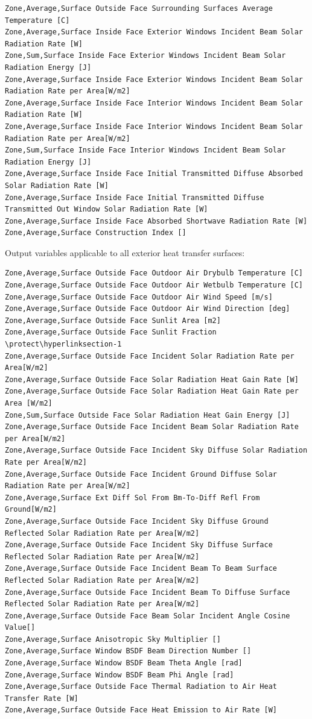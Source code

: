 \begin{lstlisting}
Zone,Average,Surface Outside Face Surrounding Surfaces Average Temperature [C]
Zone,Average,Surface Inside Face Exterior Windows Incident Beam Solar Radiation Rate [W]
Zone,Sum,Surface Inside Face Exterior Windows Incident Beam Solar Radiation Energy [J]
Zone,Average,Surface Inside Face Exterior Windows Incident Beam Solar Radiation Rate per Area[W/m2]
Zone,Average,Surface Inside Face Interior Windows Incident Beam Solar Radiation Rate [W]
Zone,Average,Surface Inside Face Interior Windows Incident Beam Solar Radiation Rate per Area[W/m2]
Zone,Sum,Surface Inside Face Interior Windows Incident Beam Solar Radiation Energy [J]
Zone,Average,Surface Inside Face Initial Transmitted Diffuse Absorbed Solar Radiation Rate [W]
Zone,Average,Surface Inside Face Initial Transmitted Diffuse Transmitted Out Window Solar Radiation Rate [W]
Zone,Average,Surface Inside Face Absorbed Shortwave Radiation Rate [W]
Zone,Average,Surface Construction Index []
\end{lstlisting}

Output variables applicable to all exterior heat transfer surfaces:

\begin{lstlisting}
Zone,Average,Surface Outside Face Outdoor Air Drybulb Temperature [C]
Zone,Average,Surface Outside Face Outdoor Air Wetbulb Temperature [C]
Zone,Average,Surface Outside Face Outdoor Air Wind Speed [m/s]
Zone,Average,Surface Outside Face Outdoor Air Wind Direction [deg]
Zone,Average,Surface Outside Face Sunlit Area [m2]
Zone,Average,Surface Outside Face Sunlit Fraction \protect\hyperlinksection-1
Zone,Average,Surface Outside Face Incident Solar Radiation Rate per Area[W/m2]
Zone,Average,Surface Outside Face Solar Radiation Heat Gain Rate [W]
Zone,Average,Surface Outside Face Solar Radiation Heat Gain Rate per Area [W/m2]
Zone,Sum,Surface Outside Face Solar Radiation Heat Gain Energy [J]
Zone,Average,Surface Outside Face Incident Beam Solar Radiation Rate per Area[W/m2]
Zone,Average,Surface Outside Face Incident Sky Diffuse Solar Radiation Rate per Area[W/m2]
Zone,Average,Surface Outside Face Incident Ground Diffuse Solar Radiation Rate per Area[W/m2]
Zone,Average,Surface Ext Diff Sol From Bm-To-Diff Refl From Ground[W/m2]
Zone,Average,Surface Outside Face Incident Sky Diffuse Ground Reflected Solar Radiation Rate per Area[W/m2]
Zone,Average,Surface Outside Face Incident Sky Diffuse Surface Reflected Solar Radiation Rate per Area[W/m2]
Zone,Average,Surface Outside Face Incident Beam To Beam Surface Reflected Solar Radiation Rate per Area[W/m2]
Zone,Average,Surface Outside Face Incident Beam To Diffuse Surface Reflected Solar Radiation Rate per Area[W/m2]
Zone,Average,Surface Outside Face Beam Solar Incident Angle Cosine Value[]
Zone,Average,Surface Anisotropic Sky Multiplier []
Zone,Average,Surface Window BSDF Beam Direction Number []
Zone,Average,Surface Window BSDF Beam Theta Angle [rad]
Zone,Average,Surface Window BSDF Beam Phi Angle [rad]
Zone,Average,Surface Outside Face Thermal Radiation to Air Heat Transfer Rate [W]
Zone,Average,Surface Outside Face Heat Emission to Air Rate [W]
\end{lstlisting}

